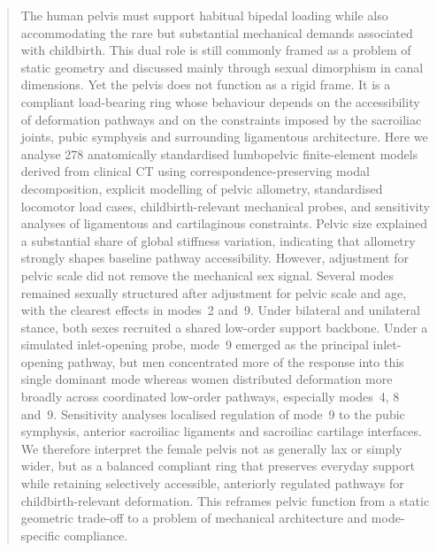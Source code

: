 \documentclass[openacc]{rsproca_new}
\begin{document}
\begin{abstract}
The human pelvis must support habitual bipedal loading while also accommodating the rare but substantial mechanical demands associated with childbirth. This dual role is still commonly framed as a problem of static geometry and discussed mainly through sexual dimorphism in canal dimensions. Yet the pelvis does not function as a rigid frame. It is a compliant load-bearing ring whose behaviour depends on the accessibility of deformation pathways and on the constraints imposed by the sacroiliac joints, pubic symphysis and surrounding ligamentous architecture. Here we analyse 278 anatomically standardised lumbopelvic finite-element models derived from clinical CT using correspondence-preserving modal decomposition, explicit modelling of pelvic allometry, standardised locomotor load cases, childbirth-relevant mechanical probes, and sensitivity analyses of ligamentous and cartilaginous constraints. Pelvic size explained a substantial share of global stiffness variation, indicating that allometry strongly shapes baseline pathway accessibility. However, adjustment for pelvic scale did not remove the mechanical sex signal. Several modes remained sexually structured after adjustment for pelvic scale and age, with the clearest effects in modes~2 and~9. Under bilateral and unilateral stance, both sexes recruited a shared low-order support backbone. Under a simulated inlet-opening probe, mode~9 emerged as the principal inlet-opening pathway, but men concentrated more of the response into this single dominant mode whereas women distributed deformation more broadly across coordinated low-order pathways, especially modes~4, 8 and~9. Sensitivity analyses localised regulation of mode~9 to the pubic symphysis, anterior sacroiliac ligaments and sacroiliac cartilage interfaces. We therefore interpret the female pelvis not as generally lax or simply wider, but as a balanced compliant ring that preserves everyday support while retaining selectively accessible, anteriorly regulated pathways for childbirth-relevant deformation. This reframes pelvic function from a static geometric trade-off to a problem of mechanical architecture and mode-specific compliance.
\end{abstract}

\maketitle
\end{document}

